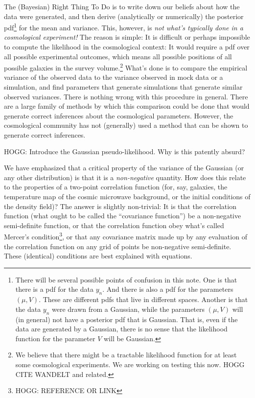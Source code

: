 \documentclass[12pt, letterpaper, preprint]{aastex}
\newcommand{\documentname}{note}
\begin{document}
The (Bayesian) Right Thing To Do is to write down our beliefs about
how the data were generated, and then derive (analytically or
numerically) the posterior pdf\footnote{There will be several possible
  points of confusion in this \documentname. One is that there is a
  pdf for the data $y_n$. And there is also a pdf for the parameters
  $(\mu,V)$. These are different pdfs that live in different
  spaces. Another is that the data $y_n$ were drawn from a Gaussian,
  while the parameters $(\mu,V)$ will (in general) not have a
  posterior pdf that is Gaussian. That is, even if the data are
  generated by a Gaussian, there is no sense that the likelihood
  function for the parameter $V$ will be Gaussian.} for the mean and
variance.
This, however, is \emph{not what's typically done in a cosmological
experiment!}
The reason is simple: It is difficult or perhaps impossible to compute
the likelihood in the cosmological context: It would require a pdf
over all possible experimental outcomes, which means all possible
positions of all possible galaxies in the survey volume.\footnote{We
  believe that there might be a tractable likelihood function for at
  least some cosmological experiments. We are working on testing this
  now. HOGG CITE WANDELT and related.}
What's done is to compare the empirical variance of the observed data
to the variance observed in mock data or a simulation, and find
parameters that generate simulations that generate similar observed
variances.
There is nothing wrong with this procedure in general.
There are a large family of methods by which this comparison could be
done that would generate correct inferences about the cosmological
parameters.
However, the cosmological community has not (generally) used a method
that can be shown to generate correct inferences.


HOGG: Introduce the Gaussian pseudo-likelihood. Why is this patently absurd?

We have emphasized that a critical property of the variance of the Gaussian (or any other
distribution) is that it is a \emph{non-negative} quantity.
How does this relate to the properties of a two-point correlation
function (for, say, galaxies, the temperature map of the cosmic
microwave background, or the initial conditions of the density field)?
The answer is slightly non-trivial:
It is that the correlation function (what ought to be called the
``covariance function'') be a non-negative semi-definite function, or
that the correlation function obey what's called Mercer's condition\footnote{HOGG: REFERENCE OR LINK},
or that any covariance matrix made up by any evaluation of the
correlation function on any grid of points be non-negative
semi-definite.
These (identical) conditions are best explained with equations.
\end{document}
